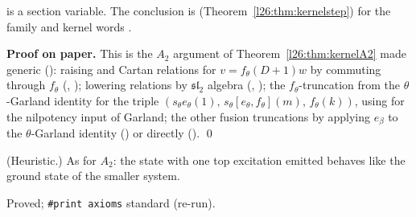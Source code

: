 \begin{dictionary}
 is a section variable. The conclusion is  (Theorem~\ref{l26:thm:kernelstep}) for the family
 and kernel words .
\end{dictionary}

\textbf{Proof on paper.} This is the $A_2$ argument of Theorem~\ref{l26:thm:kernelA2} made generic (): raising and
Cartan relations for $v=f_\theta(D+1)w$ by commuting through $f_\theta$ (, ); lowering relations by
$\mathfrak{sl}_2$ algebra (, ); the $f_\theta$-truncation from the $\theta$-Garland identity for the
triple $(s_\theta e_\theta(1),\,s_\theta[e_\theta,f_\theta](m),\,f_\theta(k))$, using  for the nilpotency input of
Garland; the other fusion truncations by applying $e_\beta$ to the $\theta$-Garland identity () or directly
(). \qed

\begin{physics}
(Heuristic.) As for $A_2$: the state with one top excitation emitted behaves like the ground state of the smaller system.
\end{physics}

\begin{status}
Proved; \texttt{\#print axioms} standard (re-run).
\end{status}

